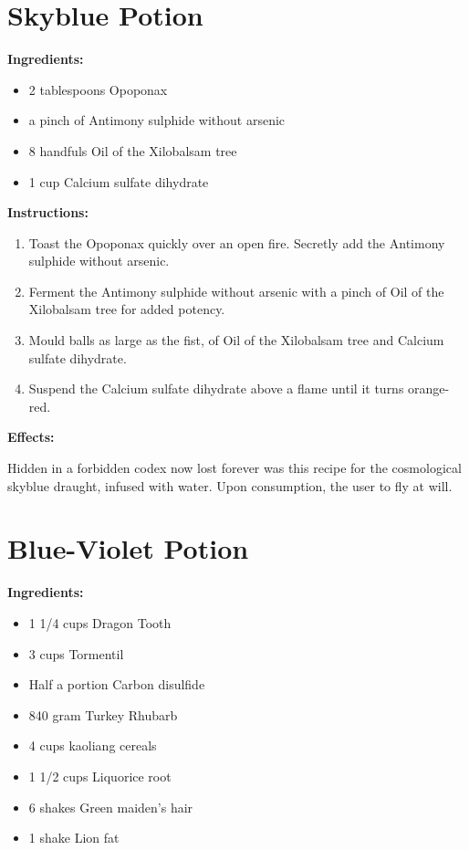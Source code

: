 \documentclass{article}
\begin{document}
\newpage
\section*{Skyblue Potion}

\textbf{Ingredients:}

\begin{itemize}
  \item 2 tablespoons Opoponax
  \item a pinch of Antimony sulphide without arsenic
  \item 8 handfuls Oil of the Xilobalsam tree
  \item 1 cup Calcium sulfate dihydrate
\end{itemize}

\textbf{Instructions:}

\begin{enumerate}
  \item Toast the Opoponax quickly over an open fire. Secretly add the Antimony sulphide without arsenic.
  \item Ferment the Antimony sulphide without arsenic with a pinch of Oil of the Xilobalsam tree for added potency.
  \item Mould balls as large as the fist, of Oil of the Xilobalsam tree and Calcium sulfate dihydrate.
  \item Suspend the Calcium sulfate dihydrate above a flame until it turns orange-red.
\end{enumerate}

\textbf{Effects:}

Hidden in a forbidden codex now lost forever was this recipe for the cosmological skyblue draught, infused with water. Upon consumption, the user to fly at will.

\newpage
\section*{Blue-Violet Potion}

\textbf{Ingredients:}

\begin{itemize}
  \item 1 1/4 cups Dragon Tooth
  \item 3 cups Tormentil
  \item Half a portion Carbon disulfide
  \item 840 gram Turkey Rhubarb
  \item 4 cups kaoliang cereals
  \item 1 1/2 cups Liquorice root
  \item 6 shakes Green maiden's hair
  \item 1 shake Lion fat
\end{itemize}
\end{document}
